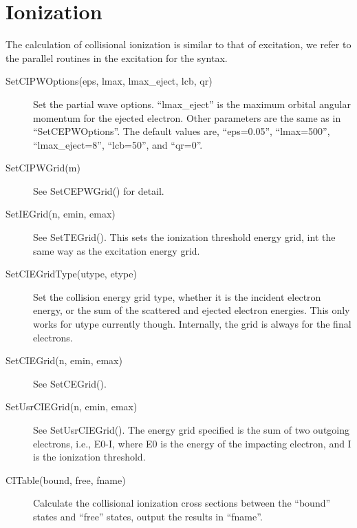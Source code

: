 \documentclass[12pt]{article}
\begin{document}
\section{Ionization}
The calculation of collisional ionization is similar to that of excitation, we
refer to the parallel routines in the excitation for the syntax.
\begin{description}
\item[SetCIPWOptions(eps, lmax, lmax\_eject, lcb, qr)]
Set the partial wave options. ``lmax\_eject'' is the maximum
orbital angular momentum for the ejected electron. Other parameters are the
same as in ``SetCEPWOptions''. The default values are,
``eps=0.05'', ``lmax=500'', ``lmax\_eject=8'', ``lcb=50'', and ``qr=0''.

\item[SetCIPWGrid(m)]
See SetCEPWGrid() for detail.

\item[SetIEGrid(n, emin, emax)]
See SetTEGrid(). This sets the ionization threshold energy grid, int the same
way as the excitation energy grid.

\item[SetCIEGridType(utype, etype)]
Set the collision energy grid type, whether it is the incident electron
energy, or the sum of the scattered and ejected electron energies. This only
works for utype currently though. Internally, the grid is always for the final
electrons.  

\item[SetCIEGrid(n, emin, emax)]
See SetCEGrid().

\item[SetUsrCIEGrid(n, emin, emax)]
See SetUsrCIEGrid(). The energy grid specified is the sum of two outgoing
electrons, i.e., E0-I, where E0 is the energy of the impacting electron, and I
is the ionization threshold.

\item[CITable(bound, free, fname)] 
Calculate the collisional ionization cross sections between the ``bound''
states and ``free'' states, output the results in ``fname''.
\end{description}
\end{document}
